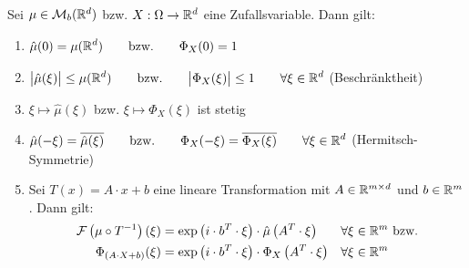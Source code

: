 \begin{theorem}\label{theorem6.1EigenschaftenDerFTCF}\enter
Sei $\mu\in\mathcal{M}_b(\mathbb{R}^d)$ bzw. $X:\Omega\to\mathbb{R}^d$ eine Zufallsvariable. Dann gilt:
\begin{enumerate}[label=(\alph*)]
\item $\begin{aligned}
\hat{\mu}(0)=\mu(\mathbb{R}^d)\qquad\text{bzw.}\qquad\Phi_X(0)=1
\end{aligned}$
\item $\begin{aligned}
\big|\hat{\mu}(\xi)\big|\leq\mu(\mathbb{R}^d)\qquad\text{bzw.}\qquad\big|\Phi_X(\xi)\big|\leq 1 \qquad\forall\xi\in\mathbb{R}^d
\end{aligned}$ (Beschränktheit)
\item $\xi\mapsto\hat{\mu}(\xi)$ bzw. $\xi\mapsto\Phi_X(\xi)$ ist stetig
\item $\begin{aligned}
\hat{\mu}(-\xi)=\overline{\hat{\mu}(\xi)}\qquad\text{bzw.}\qquad\Phi_X(-\xi)=\overline{\Phi_X(\xi)}\qquad\forall\xi\in\mathbb{R}^d
\end{aligned}$ (Hermitsch-Symmetrie)
\item Sei $T(x)=A\cdot x+b$ eine lineare Transformation mit $A\in\mathbb{R}^{m\times d}$ und $b\in\mathbb{R}^m$. Dann gilt:
\begin{align*}
\mathcal{F}\left(\mu\circ T^{-1}\right)(\xi)&=\exp\left(i\cdot b^T\cdot\xi\right)\cdot\hat{\mu}\left(A^T\cdot\xi\right)
&\forall&\xi\in\mathbb{R}^m\text{ bzw.}\\
\Phi_{(A\cdot X+b)}(\xi)
&=\exp\left(i\cdot b^T\cdot\xi\right)\cdot\Phi_X\left(A^T\cdot\xi\right)
&\forall&\xi\in\mathbb{R}^m
\end{align*}
\end{enumerate}
\end{theorem}

